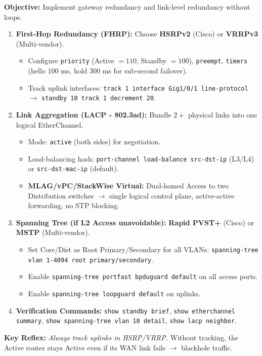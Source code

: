 \documentclass[11pt]{article}
\begin{document}
\begin{methode}
\textbf{Objective:} Implement gateway redundancy and link-level redundancy without loops.
\begin{enumerate}
    \item \textbf{First-Hop Redundancy (FHRP):} Choose \textbf{HSRPv2} (Cisco) or \textbf{VRRPv3} (Multi-vendor).
    \begin{itemize}
        \item Configure \texttt{priority} (Active $= 110$, Standby $= 100$), \texttt{preempt}, \texttt{timers} (hello $100$ ms, hold $300$ ms for sub-second failover).
        \item Track uplink interfaces: \texttt{track 1 interface Gig1/0/1 line-protocol} $\rightarrow$ \texttt{standby 10 track 1 decrement 20}.
    \end{itemize}
    \item \textbf{Link Aggregation (LACP - 802.3ad):} Bundle $2+$ physical links into one logical EtherChannel.
    \begin{itemize}
        \item Mode: \texttt{active} (both sides) for negotiation.
        \item Load-balancing hash: \texttt{port-channel load-balance src-dst-ip} (L3/L4) or \texttt{src-dst-mac-ip} (default).
        \item \textbf{MLAG/vPC/StackWise Virtual:} Dual-homed Access to two Distribution switches $\rightarrow$ single logical control plane, active-active forwarding, no STP blocking.
    \end{itemize}
    \item \textbf{Spanning Tree (if L2 Access unavoidable):} \textbf{Rapid PVST+} (Cisco) or \textbf{MSTP} (Multi-vendor).
    \begin{itemize}
        \item Set Core/Dist as Root Primary/Secondary for all VLANs: \texttt{spanning-tree vlan 1-4094 root primary/secondary}.
        \item Enable \texttt{spanning-tree portfast bpduguard default} on all access ports.
        \item Enable \texttt{spanning-tree loopguard default} on uplinks.
    \end{itemize}
    \item \textbf{Verification Commands:} \texttt{show standby brief}, \texttt{show etherchannel summary}, \texttt{show spanning-tree vlan 10 detail}, \texttt{show lacp neighbor}.
\end{enumerate}
\textbf{Key Reflex:} \emph{Always track uplinks in HSRP/VRRP.} Without tracking, the Active router stays Active even if its WAN link fails $\rightarrow$ blackhole traffic.
\end{methode}
\end{document}
